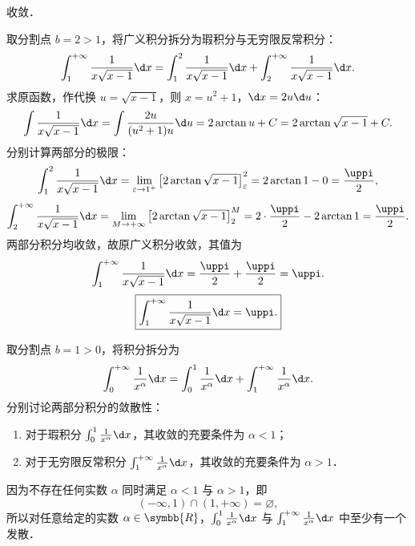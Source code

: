 \begin{solution}
     收敛．

    取分割点 $b = 2 > 1$，将广义积分拆分为瑕积分与无穷限反常积分：
    \begin{equation}
        \int_1^{+\infty} \frac{1}{x\sqrt{x - 1}} \d x = \int_1^2 \frac{1}{x\sqrt{x - 1}} \d x + \int_2^{+\infty} \frac{1}{x\sqrt{x - 1}} \d x.
    \end{equation}
    求原函数，作代换 $u = \sqrt{x - 1}$，则 $x = u^2 + 1$，$\d x = 2u \d u$：
    \begin{equation}
        \int \frac{1}{x\sqrt{x - 1}} \d x = \int \frac{2u}{(u^2 + 1)u} \d u = 2\arctan u + C = 2\arctan\sqrt{x - 1} + C.
    \end{equation}
    分别计算两部分的极限：
    \begin{equation}
        \int_1^2 \frac{1}{x\sqrt{x - 1}} \d x = \lim_{\varepsilon\to 1^+} \left[ 2\arctan\sqrt{x - 1} \right]_\varepsilon^2 = 2\arctan 1 - 0 = \frac{\uppi}{2},
    \end{equation}
    \begin{equation}
        \int_2^{+\infty} \frac{1}{x\sqrt{x - 1}} \d x = \lim_{M\to +\infty} \left[ 2\arctan\sqrt{x - 1} \right]_2^M = 2 \cdot \frac{\uppi}{2} - 2\arctan 1 = \frac{\uppi}{2}.
    \end{equation}
    两部分积分均收敛，故原广义积分收敛，其值为
    \begin{equation}
        \int_1^{+\infty} \frac{1}{x\sqrt{x - 1}} \d x = \frac{\uppi}{2} + \frac{\uppi}{2} = \uppi.
    \end{equation}
    \begin{equation}
        \boxed{\int_1^{+\infty} \frac{1}{x\sqrt{x - 1}} \d x = \uppi.}
    \end{equation}


    取分割点 $b = 1 > 0$，将积分拆分为
    \begin{equation}
        \int_0^{+\infty} \frac{1}{x^\alpha} \d x = \int_0^1 \frac{1}{x^\alpha} \d x + \int_1^{+\infty} \frac{1}{x^\alpha} \d x.
    \end{equation}
    分别讨论两部分积分的敛散性：
    \begin{enumerate}
        \item 对于瑕积分 $\int_0^1 \frac{1}{x^\alpha} \d x$，其收敛的充要条件为 $\alpha < 1$；
        \item 对于无穷限反常积分 $\int_1^{+\infty} \frac{1}{x^\alpha} \d x$，其收敛的充要条件为 $\alpha > 1$．
    \end{enumerate}
    因为不存在任何实数 $\alpha$ 同时满足 $\alpha < 1$ 与 $\alpha > 1$，即
    \begin{equation}
        (-\infty, 1) \cap (1, +\infty) = \varnothing,
    \end{equation}
    所以对任意给定的实数 $\alpha \in \symbb{R}$，$\int_0^1 \frac{1}{x^\alpha} \d x$ 与 $\int_1^{+\infty} \frac{1}{x^\alpha} \d x$ 中至少有一个发散．


\end{solution}
